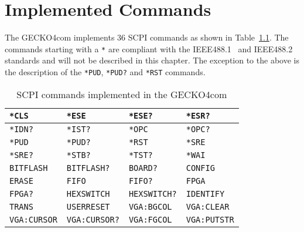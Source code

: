 \chapter{Implemented Commands}
\label{chap:commands}
The {\sc GECKO4com} implements 36 {\sc SCPI} commands as shown in
Table~\ref{tab:scpi commands}. The commands starting with a \verb+*+ are
compliant with the IEEE488.1~\cite{ieee488_1} and IEEE488.2~\cite{ieee488_2}
standards and will not be described in this chapter. The exception to the above
is the description of the \verb+*PUD+, \verb+*PUD?+ and \verb+*RST+ commands.
\begin{table}[hb]
\begin{tabular}{|l|l|l|l|}
\hline
\verb+*CLS+&\verb+*ESE+&\verb+*ESE?+&\verb+*ESR?+\\
\hline
\verb+*IDN?+&\verb+*IST?+&\verb+*OPC+&\verb+*OPC?+\\
\hline
\verb+*PUD+&\verb+*PUD?+&\verb+*RST+&\verb+*SRE+\\
\hline
\verb+*SRE?+&\verb+*STB?+&\verb+*TST?+&\verb+*WAI+\\
\hline
\verb+BITFLASH+&\verb+BITFLASH?+&\verb+BOARD?+&\verb+CONFIG+\\
\hline
\verb+ERASE+&\verb+FIFO+&\verb+FIFO?+&\verb+FPGA+\\
\hline
\verb+FPGA?+&\verb+HEXSWITCH+&\verb+HEXSWITCH?+&\verb+IDENTIFY+\\
\hline
\verb+TRANS+&\verb+USERRESET+&\verb+VGA:BGCOL+&\verb+VGA:CLEAR+\\
\hline
\verb+VGA:CURSOR+&\verb+VGA:CURSOR?+&\verb+VGA:FGCOL+&\verb+VGA:PUTSTR+\\
\hline
\end{tabular}
\caption{{\sc SCPI} commands implemented in the {\sc GECKO4com}}
\label{tab:scpi commands}
\end{table}
